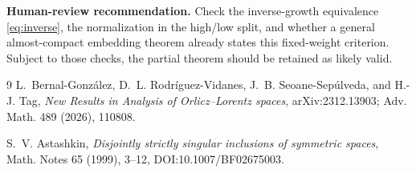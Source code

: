 \documentclass[11pt]{article}
\begin{document}
\medskip
\noindent\textbf{Human-review recommendation.}
Check the inverse-growth equivalence \eqref{eq:inverse}, the normalization in
the high/low split, and whether a general almost-compact embedding theorem
already states this fixed-weight criterion.  Subject to those checks, the
partial theorem should be retained as likely valid.

\begin{thebibliography}{9}
L.~Bernal-Gonz\'alez, D.~L. Rodr\'iguez-Vidanes,
J.~B. Seoane-Sep\'ulveda, and H.-J. Tag,
\emph{New Results in Analysis of Orlicz--Lorentz spaces},
arXiv:2312.13903; Adv. Math. 489 (2026), 110808.

S.~V. Astashkin,
\emph{Disjointly strictly singular inclusions of symmetric spaces},
Math. Notes 65 (1999), 3--12, DOI:10.1007/BF02675003.
\end{thebibliography}
\end{document}
